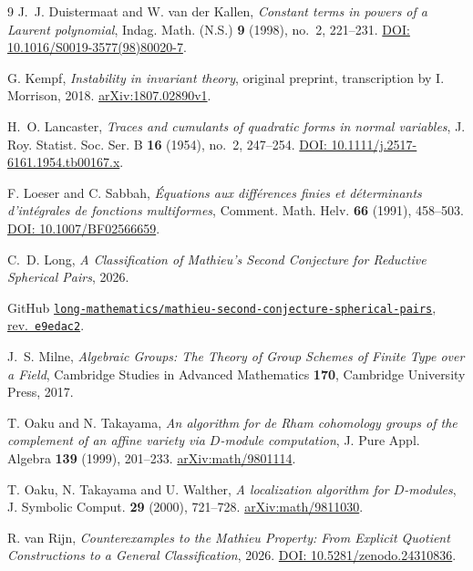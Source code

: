 \documentclass[11pt]{article}
\begin{document}
\begin{thebibliography}{9}
J.~J. Duistermaat and W. van der Kallen,
\emph{Constant terms in powers of a Laurent polynomial},
Indag. Math. (N.S.) \textbf{9} (1998), no.~2, 221--231.
\href{https://doi.org/10.1016/S0019-3577(98)80020-7}{DOI: 10.1016/S0019-3577(98)80020-7}.

G. Kempf, \emph{Instability in invariant theory}, original preprint,
transcription by I. Morrison, 2018.
\href{https://arxiv.org/abs/1807.02890v1}{arXiv:1807.02890v1}.

H.~O. Lancaster, \emph{Traces and cumulants of quadratic forms in normal
variables}, J. Roy. Statist. Soc. Ser. B \textbf{16} (1954), no.~2,
247--254.
\href{https://doi.org/10.1111/j.2517-6161.1954.tb00167.x}{DOI: 10.1111/j.2517-6161.1954.tb00167.x}.

F. Loeser and C. Sabbah,
\emph{\'Equations aux diff\'erences finies et d\'eterminants d'int\'egrales
de fonctions multiformes}, Comment. Math. Helv. \textbf{66} (1991), 458--503.
\href{https://doi.org/10.1007/BF02566659}{DOI: 10.1007/BF02566659}.

C.~D. Long,
\emph{A Classification of Mathieu's Second Conjecture for Reductive
Spherical Pairs}, 2026.\par\nopagebreak
GitHub \href{https://github.com/long-mathematics/mathieu-second-conjecture-spherical-pairs}{\nolinkurl{long-mathematics/mathieu-second-conjecture-spherical-pairs}},
\href{https://github.com/long-mathematics/mathieu-second-conjecture-spherical-pairs/blob/e9edac262b4b64eb68feb0e6e80496cefe4a1dee/mathieu_second_conjecture_spherical_pairs.tex}{rev.~\texttt{e9edac2}}.

J.~S. Milne,
\emph{Algebraic Groups: The Theory of Group Schemes of Finite Type over a
Field}, Cambridge Studies in Advanced Mathematics \textbf{170},
Cambridge University Press, 2017.

T. Oaku and N. Takayama,
\emph{An algorithm for de Rham cohomology groups of the complement of an
affine variety via \(D\)-module computation}, J. Pure Appl. Algebra
\textbf{139} (1999), 201--233.
\href{https://arxiv.org/abs/math/9801114}{arXiv:math/9801114}.

T. Oaku, N. Takayama and U. Walther,
\emph{A localization algorithm for \(D\)-modules}, J. Symbolic Comput.
\textbf{29} (2000), 721--728.
\href{https://arxiv.org/abs/math/9811030}{arXiv:math/9811030}.

R. van Rijn,
\emph{Counterexamples to the Mathieu Property: From Explicit Quotient
Constructions to a General Classification}, 2026.
\href{https://doi.org/10.5281/zenodo.24310836}{DOI: 10.5281/zenodo.24310836}.
\end{thebibliography}
\end{document}
